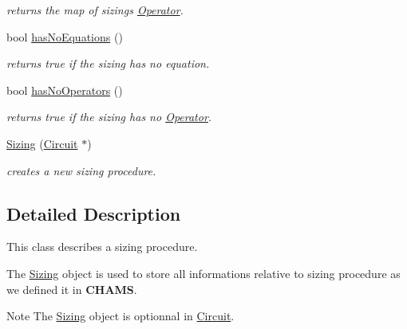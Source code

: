 \begin{DoxyCompactItemize}
\begin{DoxyCompactList}\small\item\em returns the map of sizing\textquotesingle{}s \mbox{\hyperlink{class_open_chams_1_1_operator}{Operator}}. \end{DoxyCompactList}\item 
\mbox{\label{class_open_chams_1_1_sizing_a1b6ba7a6c0883f65fa26ad46691946cb}} 
bool \mbox{\hyperlink{class_open_chams_1_1_sizing_a1b6ba7a6c0883f65fa26ad46691946cb}{has\+No\+Equations}} ()
\begin{DoxyCompactList}\small\item\em returns true if the sizing has no equation. \end{DoxyCompactList}\item 
\mbox{\label{class_open_chams_1_1_sizing_ac8a299add4fd32ff8bf99c889f4a79a6}} 
bool \mbox{\hyperlink{class_open_chams_1_1_sizing_ac8a299add4fd32ff8bf99c889f4a79a6}{has\+No\+Operators}} ()
\begin{DoxyCompactList}\small\item\em returns true if the sizing has no \mbox{\hyperlink{class_open_chams_1_1_operator}{Operator}}. \end{DoxyCompactList}\item 
\mbox{\hyperlink{class_open_chams_1_1_sizing_aa1e5f28af7b674134fda04ce64bf1004}{Sizing}} (\mbox{\hyperlink{class_open_chams_1_1_circuit}{Circuit}} $\ast$)
\begin{DoxyCompactList}\small\item\em creates a new sizing procedure. \end{DoxyCompactList}\end{DoxyCompactItemize}


\subsection{Detailed Description}
This class describes a sizing procedure.

The \mbox{\hyperlink{class_open_chams_1_1_sizing}{Sizing}} object is used to store all informations relative to sizing procedure as we defined it in {\bfseries C\+H\+A\+MS}.

\begin{DoxyNote}{Note}
The \mbox{\hyperlink{class_open_chams_1_1_sizing}{Sizing}} object is optionnal in \mbox{\hyperlink{class_open_chams_1_1_circuit}{Circuit}}. 
\end{DoxyNote}


